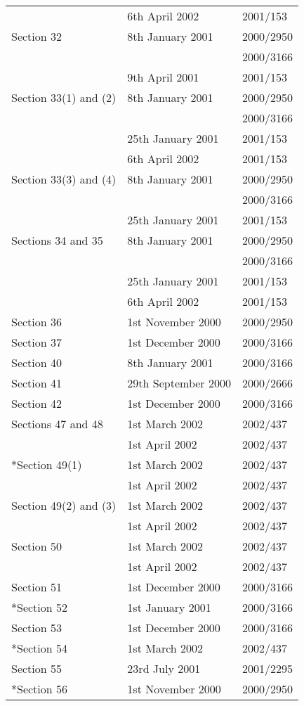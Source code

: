 \documentclass[12pt,a4paper]{article}
\begin{document}
{\begin{longtable}{p{194.81242pt}p{92.22098pt}p{43.81pt}}
	&6th April 2002	&2001/153\\
Section 32	&8th January 2001	&2000/2950\\
		&&2000/3166\\
	&9th April 2001	&2001/153\\
Section 33(1) and (2)	&8th January 2001	&2000/2950\\
		&&2000/3166\\
	&25th January 2001	&2001/153\\
	&6th April 2002	&2001/153\\
Section 33(3) and (4)	&8th January 2001	&2000/2950\\
		&&2000/3166\\
	&25th January 2001	&2001/153\\
Sections 34 and 35	&8th January 2001	&2000/2950\\
		&&2000/3166\\
	&25th January 2001	&2001/153\\
	&6th April 2002	&2001/153\\
Section 36	&1st November 2000	&2000/2950\\
Section 37	&1st December 2000	&2000/3166\\
Section 40	&8th January 2001	&2000/3166\\
Section 41	&29th September 2000	&2000/2666\\
Section 42	&1st December 2000	&2000/3166\\
Sections 47 and 48	&1st March 2002	&2002/437\\
	&1st April 2002	&2002/437\\
{}*Section 49(1)	&1st March 2002	&2002/437\\
	&1st April 2002	&2002/437\\
Section 49(2) and (3)	&1st March 2002	&2002/437\\
	&1st April 2002	&2002/437\\
Section 50	&1st March 2002	&2002/437\\
	&1st April 2002	&2002/437\\
Section 51	&1st December 2000	&2000/3166\\
{}*Section 52	&1st January 2001	&2000/3166\\
Section 53	&1st December 2000	&2000/3166\\
{}*Section 54	&1st March 2002	&2002/437\\
Section 55	&23rd July 2001	&2001/2295\\
{}*Section 56	&1st November 2000	&2000/2950\\

\end{longtable}}
\end{document}
